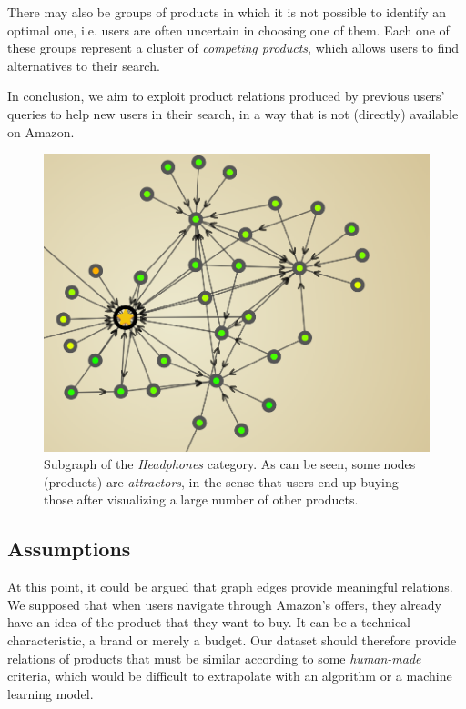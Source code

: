 \documentclass[a4paper,12pt]{article}
\begin{document}
There may also be groups of products in which it is not possible to identify an optimal one, i.e. users are often uncertain in choosing one of them. Each one of these groups represent a cluster of \textit{competing products}, which allows users to find alternatives to their search.

In conclusion, we aim to exploit product relations produced by previous users' queries to help new users in their search, in a way that is not (directly) available on Amazon.


\begin{figure}[H]
	\centering{}
	\includegraphics[width=\textwidth]{img/graph_example.png}
	\caption{Subgraph of the \emph{Headphones} category. As can be seen, some nodes (products) are \emph{attractors}, in the sense that users end up buying those after visualizing a large number of other products.}
	\label{fig:graphNav}
\end{figure}
\subsection{Assumptions}
At this point, it could be argued that graph edges provide meaningful relations. We supposed that when users navigate through Amazon's offers, they already have an idea of the product that they want to buy. It can be a technical characteristic, a brand or merely a budget. Our dataset should therefore provide relations of products that must be similar according to some \textit{human-made} criteria, which would be difficult to extrapolate with an algorithm or a machine learning model.
\end{document}
